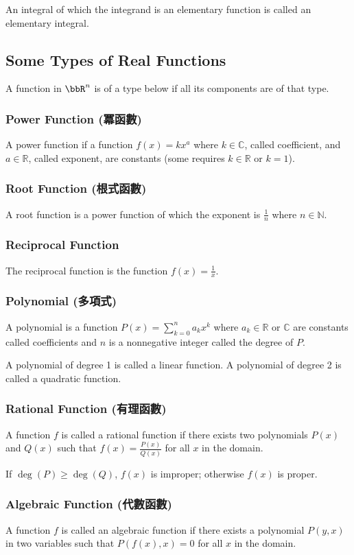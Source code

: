 An integral of which the integrand is an elementary function is called an elementary integral.
\subsection{Some Types of Real Functions}
A function in $\bbR^n$ is of a type below if all its components are of that type.
\subsubsection{Power Function (冪函數)}
A power function if a function $f(x)=kx^a$ where $k\in\mathbb{C}$, called coefficient, and $a\in\mathbb{R}$, called exponent, are constants (some requires $k\in\mathbb{R}$ or $k=1$).
\subsubsection{Root Function (根式函數)}
A root function is a power function of which the exponent is $\frac{1}{n}$ where $n\in\mathbb{N}$.
\subsubsection{Reciprocal Function}
The reciprocal function is the function $f(x)=\frac{1}{x}$.
\subsubsection{Polynomial (多項式)}
A polynomial is a function $P(x)=\sum_{k=0}^na_kx^k$ where $a_k\in\mathbb{R}$ or $\mathbb{C}$ are constants called coefficients and $n$ is a nonnegative integer called the degree of $P$.

A polynomial of degree 1 is called a linear function. A polynomial of degree 2 is called a quadratic function.
\subsubsection{Rational Function (有理函數)}
A function $f$ is called a rational function if there exists two polynomials $P(x)$ and $Q(x)$ such that $f(x)=\frac{P(x)}{Q(x)}$ for all $x$ in the domain.

If $\deg(P)\geq\deg(Q)$, $f(x)$ is improper; otherwise $f(x)$ is proper.
\subsubsection{Algebraic Function (代數函數)}
A function $f$ is called an algebraic function if there exists a polynomial $P(y,x)$ in two variables such that $P(f(x),x)=0$ for all $x$ in the domain.
